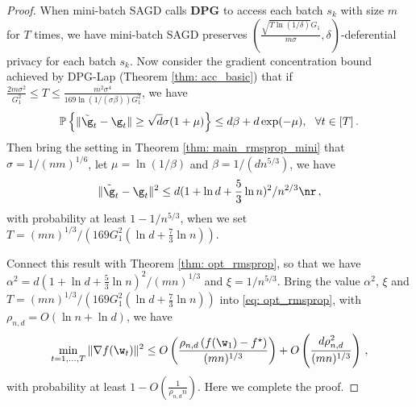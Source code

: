\theomini*

\begin{proof} When mini-batch SAGD calls \textbf{DPG} to access each batch $s_k$ with size $m$ for $T$ times, we have mini-batch SAGD preserves $(\frac{\sqrt{T \ln(1/\delta)} G_1}{m\sigma}, \delta)$-deferential privacy for each batch $s_k$. Now consider the gradient concentration bound achieved by DPG-Lap (Theorem \ref{thm: acc_basic}) that if $ \frac{2m\sigma^2}{G_1^2}\leq T \leq \frac{m^2 \sigma^4}{169 \ln(1/(\sigma \beta))G_1^2}$, we have 
\begin{align*}
\mathbb{P}\left\{\|\tilde \g_t - \g_t\| \geq \sqrt{d}\sigma(1+\mu)\right\} \leq d\beta + d\exp(-\mu), \ \ \forall t \in [T]  \, .
\end{align*}
Then bring the setting in Theorem \ref{thm: main_rmsprop_mini} that $\sigma = 1/(nm)^{1/6}$, let $\mu = \ln (1/\beta)$ and $\beta = 1/(d n^{5/3})$, we have
\begin{equation}
 \|\tilde \g_t - \g_t\|^2 \leq d(1+\ln d + \frac{5}{3}\ln n)^2/n^{2/3}   \nr  \, ,
\end{equation}
with probability at least $1- 1/n^{5/3}$, when we set $T = (mn)^{1/3}/\left(169G_1^2(\ln d + \frac{7}{3}\ln n)\right)$. 


Connect this result with Theorem \ref{thm: opt_rmsprop}, so that we have $\alpha^2 = d(1+\ln d + \frac{5}{3}\ln n)^2/(mn)^{1/3}$ and $\xi = 1/n^{5/3}$. Bring the value $\alpha^2$, $\xi$ and $T = (mn)^{1/3}/\left(169G_1^2(\ln d + \frac{7}{3}\ln n)\right)$ into \eqref{eq: opt_rmsprop}, with $\rho_{n,d} = O \left(\ln n + \ln d \right)$, we have
\begin{align*}
\min_{t = 1,..., T}\|\nabla f(\w_t)\|^2 \leq O\left( \frac{\rho_{n,d} \left(f(\w_1) - f^\star \right)}{(mn)^{1/3}} \right) + O \left( \frac{d \rho_{n,d}^2}{(mn)^{1/3}}\right)  \, ,
\end{align*} 
with probability at least $1-O\left(\frac{1}{\rho_{n,d} n}\right)$. Here we complete the proof.

\end{proof}

